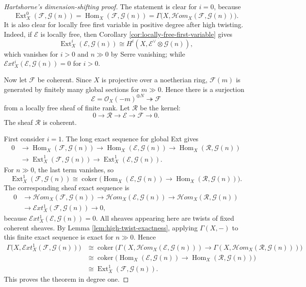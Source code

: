 \documentclass[11pt,a4paper]{article}
\numberwithin{equation}{section}
\theoremstyle{plain}
\theoremstyle{definition}
\theoremstyle{remark}
\newcommand{\OO}{\mathcal O}
\newcommand{\F}{\mathcal F}
\newcommand{\G}{\mathcal G}
\newcommand{\E}{\mathcal E}
\newcommand{\R}{\mathcal R}
\DeclareMathOperator{\Ext}{Ext}
\DeclareMathOperator{\Hom}{Hom}
\DeclareMathOperator{\coker}{coker}
\newcommand{\sExt}{\mathcal{E}\!xt}
\newcommand{\sHom}{\mathcal{H}\!om}
\begin{document}
\begin{proof}[Hartshorne's dimension-shifting proof]
The statement is clear for \(i=0\), because
\[
  \Ext_X^0(\F,\G(n))=
  \Hom_X(\F,\G(n))
  =
  \Gamma\bigl(X,\sHom_X(\F,\G(n))\bigr).
\]
It is also clear for locally free first variable in positive degree after high twisting.  Indeed, if \(\E\) is locally free, then Corollary \ref{cor:locally-free-first-variable} gives
\[
  \Ext_X^i(\E,\G(n))
  \cong
  H^i(X,\E^\vee\otimes\G(n)),
\]
which vanishes for \(i>0\) and \(n\gg0\) by Serre vanishing; while \(\sExt_X^i(\E,\G(n))=0\) for \(i>0\).

Now let \(\F\) be coherent.  Since \(X\) is projective over a noetherian ring, \(\F(m)\) is generated by finitely many global sections for \(m\gg0\).  Hence there is a surjection
\[
  \E=\OO_X(-m)^{\oplus N}\twoheadrightarrow \F
\]
from a locally free sheaf of finite rank.  Let \(\R\) be the kernel:
\[
  0\longrightarrow \R\longrightarrow \E\longrightarrow \F\longrightarrow0.
\]
The sheaf \(\R\) is coherent.

First consider \(i=1\).  The long exact sequence for global Ext gives
\[
\begin{aligned}
0&\longrightarrow \Hom_X(\F,\G(n))
 \longrightarrow \Hom_X(\E,\G(n))
 \longrightarrow \Hom_X(\R,\G(n)) \\
&\longrightarrow \Ext_X^1(\F,\G(n))
 \longrightarrow \Ext_X^1(\E,\G(n)).
\end{aligned}
\]
For \(n\gg0\), the last term vanishes, so
\[
  \Ext_X^1(\F,\G(n))
  \cong
  \coker\bigl(\Hom_X(\E,\G(n))
  \to \Hom_X(\R,\G(n))\bigr).
\]
The corresponding sheaf exact sequence is
\[
\begin{aligned}
0&\longrightarrow \sHom_X(\F,\G(n))
 \longrightarrow \sHom_X(\E,\G(n))
 \longrightarrow \sHom_X(\R,\G(n)) \\
&\longrightarrow \sExt_X^1(\F,\G(n))
 \longrightarrow0,
\end{aligned}
\]
because \(\sExt_X^1(\E,\G(n))=0\).  All sheaves appearing here are twists of fixed coherent sheaves.  By Lemma \ref{lem:high-twist-exactness}, applying \(\Gamma(X,-)\) to this finite exact sequence is exact for \(n\gg0\).  Hence
\[
\begin{aligned}
\Gamma\bigl(X,\sExt_X^1(\F,\G(n))\bigr)
&\cong
\coker\bigl(
\Gamma(X,\sHom_X(\E,\G(n)))
\to
\Gamma(X,\sHom_X(\R,\G(n)))
\bigr) \\
&\cong
\coker\bigl(
\Hom_X(\E,\G(n))
\to
\Hom_X(\R,\G(n))
\bigr) \\
&\cong
\Ext_X^1(\F,\G(n)).
\end{aligned}
\]
This proves the theorem in degree one.


\end{proof}
\end{document}
